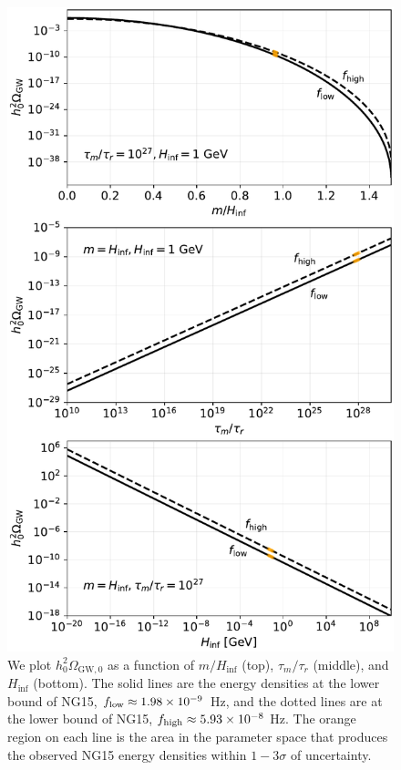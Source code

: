 \documentclass[prd,twocolumn,aps,psfig,nofootinbib,nobibnotes,superscriptaddress,preprintnumbers,times]{revtex4-2}
\begin{document}
\begin{figure}
\includegraphics[width=\linewidth]{fig2.pdf}
\caption{We plot $h_0^2\Omega_{\text{GW},0}$ as a function of $m/H_{\inf}$ (top), $\tau_m/\tau_r$ (middle), and $H_{\inf}$ (bottom). The solid lines are the energy densities at the lower bound of NG15, $f_{\rm low} \approx 1.98\times 10^{-9}$ Hz, and the dotted lines are at the lower bound of NG15, $f_{\rm high} \approx 5.93\times 10^{-8}$ Hz. The orange region on each line is the area in the parameter space that produces the observed NG15 energy densities within $1-3\sigma$ of uncertainty.}
\label{fig:contours}
\end{figure}
\end{document}
